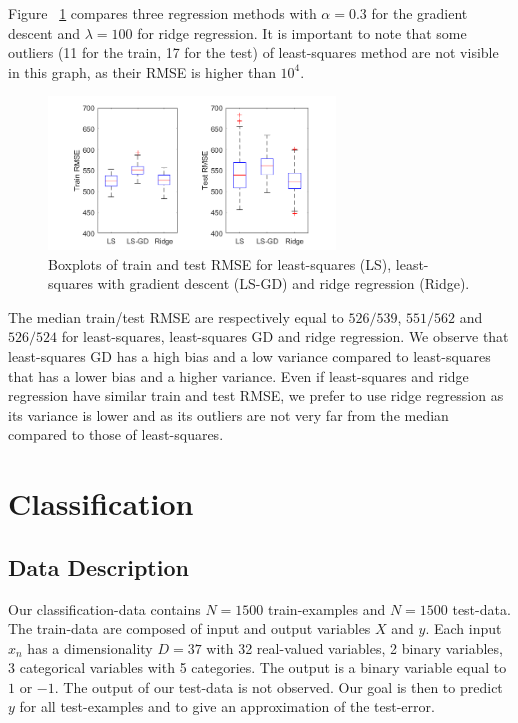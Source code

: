 \documentclass{article} %
\begin{document}
Figure ~\ref{fig:reg_compareMethods} compares three regression methods with $\alpha = 0.3$ for the gradient descent and $\lambda = 100$ for ridge regression. It is important to note that some outliers (11 for the train, 17 for the test) of least-squares method are not visible in this graph, as their RMSE is higher than $10^4$.

\begin{figure}[!h] %
	\center
	\includegraphics[width=3in]{figures/comparisonReg.png}
	\caption{Boxplots of train and test RMSE for least-squares (LS), least-squares with gradient descent (LS-GD) and ridge regression (Ridge).}
	\label{fig:reg_compareMethods}
\end{figure}

The median train/test RMSE are respectively equal to $526/539$, $551/562$ and $526/524$ for least-squares, least-squares GD and ridge regression. We observe that least-squares GD has a high bias and a low variance compared to least-squares that has a lower bias and a higher variance. Even if least-squares and ridge regression have similar train and test RMSE, we prefer to use ridge regression as its variance is lower and as its outliers are not very far from the median compared to those of least-squares.

\section{Classification}
\subsection{Data Description}
Our classification-data contains $N=1500$ train-examples and $N=1500$ test-data. The train-data are composed of input and output variables $X$ and $y$. Each input $x_n$ has a dimensionality $D=37$ with 32 real-valued variables, 2 binary variables, 3 categorical variables with 5 categories. The output is a binary variable equal to $1$ or $-1$. The output of our test-data is not observed. Our goal is then to predict $y$ for all test-examples and to give an approximation of the test-error.
\end{document}
